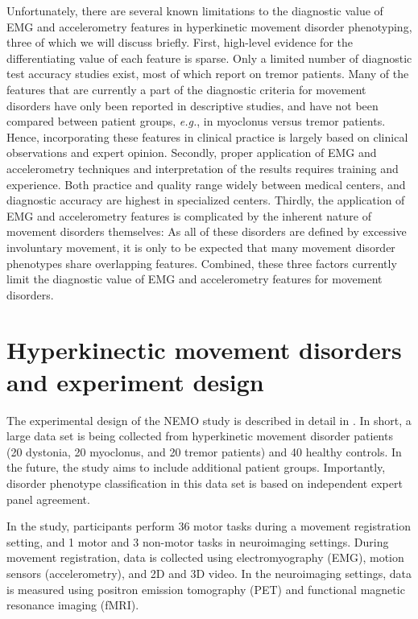 Unfortunately, there are several known limitations to the diagnostic value of EMG and accelerometry features in hyperkinetic movement disorder phenotyping, three of which we will discuss briefly. First, high-level evidence for the differentiating value of each feature is sparse. Only a limited number of diagnostic test accuracy studies exist, most of which report on tremor patients. Many of the features that are currently a part of the diagnostic criteria for movement disorders have only been reported in descriptive studies, and have not been compared between patient groups, \emph{e.g.}, in myoclonus versus tremor patients. Hence, incorporating these features in clinical practice is largely based on clinical observations and expert opinion. Secondly, proper application of EMG and accelerometry techniques and interpretation of the results requires training and experience. Both practice and quality range widely between medical centers, and diagnostic accuracy are highest in specialized centers. Thirdly, the application of EMG and accelerometry features is complicated by the inherent nature of movement disorders themselves: As all of these disorders are defined by excessive involuntary movement, it is only to be expected that many movement disorder phenotypes share overlapping features. Combined, these three factors currently limit the diagnostic value of EMG and accelerometry features for movement disorders.

\section{Hyperkinectic movement disorders and experiment design} \label{experiment}
%
%
The experimental design of the NEMO study is described in detail in \citep{NEMO}. In short, a large data set is being collected from hyperkinetic movement disorder patients (20 dystonia, 20 myoclonus, and 20 tremor patients) and 40 healthy controls. In the future, the study aims to include additional patient groups. Importantly, disorder phenotype classification in this data set is based on independent expert panel agreement.

In the study, participants perform 36 motor tasks during a movement registration setting, and 1 motor and 3 non-motor tasks in neuroimaging settings. During movement registration, data is collected using electromyography (EMG), motion sensors (accelerometry), and 2D and 3D video. In the neuroimaging settings, data is measured using positron emission tomography (PET) and functional magnetic resonance imaging (fMRI).  

